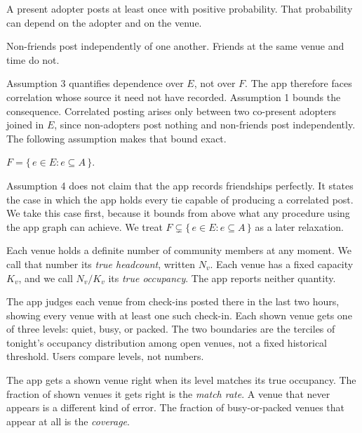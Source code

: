 \begin{assumption}
A present adopter posts at least once with positive probability. That probability can depend on
the adopter and on the venue.
\end{assumption}

\begin{assumption}
Non-friends post independently of one another. Friends at the same venue and time do not.
\end{assumption}

Assumption 3 quantifies dependence over $E$, not over $F$. The app therefore faces correlation
whose source it need not have recorded. Assumption 1 bounds the consequence. Correlated posting
arises only between two co-present adopters joined in $E$, since non-adopters post nothing and
non-friends post independently. The following assumption makes that bound exact.

\begin{assumption}
$F = \{\, e \in E : e \subseteq A \,\}$.
\end{assumption}

Assumption 4 does not claim that the app records friendships perfectly. It states the case in
which the app holds every tie capable of producing a correlated post. We take this case first,
because it bounds from above what any procedure using the app graph can achieve. We treat
$F \subsetneq \{\, e \in E : e \subseteq A \,\}$ as a later relaxation.

\begin{definition}
Each venue holds a definite number of community members at any moment. We call that number its
\emph{true headcount}, written $N_v$. Each venue has a fixed capacity $K_v$, and we call
$N_v / K_v$ its \emph{true occupancy}. The app reports neither quantity.
\end{definition}

The app judges each venue from check-ins posted there in the last two hours, showing every venue
with at least one such check-in. Each shown venue gets one of three levels: quiet, busy, or
packed. The two boundaries are the terciles of tonight's occupancy distribution among open
venues, not a fixed historical threshold. Users compare levels, not numbers.

\begin{definition}
The app gets a shown venue right when its level matches its true occupancy. The fraction of
shown venues it gets right is the \emph{match rate}. A venue that never appears is a different
kind of error. The fraction of busy-or-packed venues that appear at all is the \emph{coverage}.
\end{definition}

